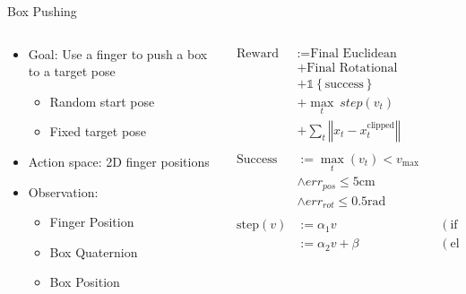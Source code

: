 \documentclass[16:9,en,navbarinfooter]{sdqbeamer}
\begin{document}
\begin{frame}{Box Pushing}

\begin{columns}[t]
    \begin{column}{0.5\textwidth}
        \vspace{1cm}
        \begin{itemize}
            \item Goal: Use a finger to push a box to a target pose
                \begin{itemize}
                    \item Random start pose
                    \item Fixed target pose
                \end{itemize}
            \item Action space: 2D finger positions
            \item Observation:
                \begin{itemize}
                    \item Finger Position
                    \item Box Quaternion
                    \item Box Position
                \end{itemize}
        \end{itemize}
            \vspace{1em}
    \end{column}
    \begin{column}{0.5\textwidth}
        \[
        \begin{aligned}
    \text{Reward} &:= \text{Final Euclidean Distance} \\
             &+  \text{Final Rotational Distance} \\
             &+  \mathds{1} \left\{\text{success}\right\} \\
             &+  \max_t\  step(v_t) \\
             &+  \sum_t \left\Vert x_t - x_t^\text{clipped} \right\Vert \\
             \\
            \text{Success} &:= \max_t(v_t) < v_\text{max} \\
                &\land err_{pos} \leq 5 \text{cm} \\
                &\land err_{rot} \leq 0.5 \text{rad} \\
                \\
            \text{step}(v) &:= \alpha_1 v \quad &&(\text{if } v \leq v_\text{max})\\
                           &:= \alpha_2 v + \beta \quad &&(\text{else})\\
        \end{aligned}
    \]
    \end{column}
\end{columns}
\end{frame}
\end{document}
